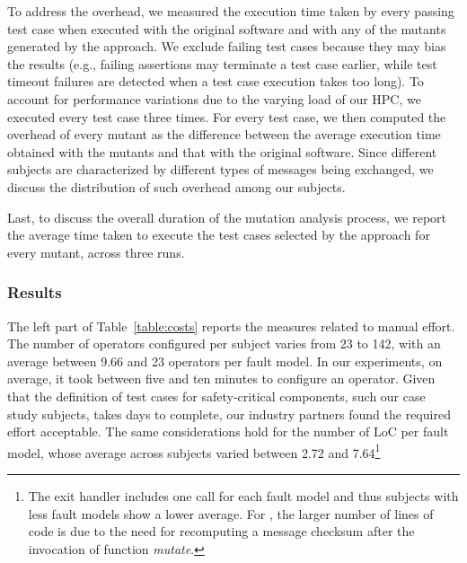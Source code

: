 

To address the overhead, we measured the execution time taken by every passing test case when executed with the original software and with any of the mutants generated by the approach. We exclude failing test cases because they may bias the results (e.g., failing assertions may terminate a test case earlier, while test timeout failures are detected when a test case execution takes too long). To account for performance variations due to the varying load of our HPC, we executed every test case three times. For every test case, we then computed the overhead of every mutant as the difference between the average execution time obtained with the mutants and that with the original software. Since different subjects are characterized by different types of messages being exchanged, we discuss the distribution of such overhead among our subjects.

Last, to discuss the overall duration of the mutation analysis process, we report the average time taken to execute {the test cases selected by the approach for every mutant, across three runs.}


\subsubsection*{Results}



The left part of Table~\ref{table:costs} reports the measures related to manual effort. The number of operators configured per subject varies from 23 to 142, with an average between 9.66 and 23 operators per fault model. {In our experiments, on average, it took between five and ten minutes to configure an operator.}
Given that the definition of test cases for safety-critical components, such our case study subjects, takes days to complete, our industry partners found the required effort acceptable.
The same considerations hold for the number of LoC per fault model, whose average across subjects varied between 2.72 and 7.64\footnote{The exit handler includes one call for each fault model and thus subjects with less fault models show a lower average. For \PARAM, the larger number of lines of code is due to the need for recomputing a message checksum after the invocation of function \emph{mutate}.}

